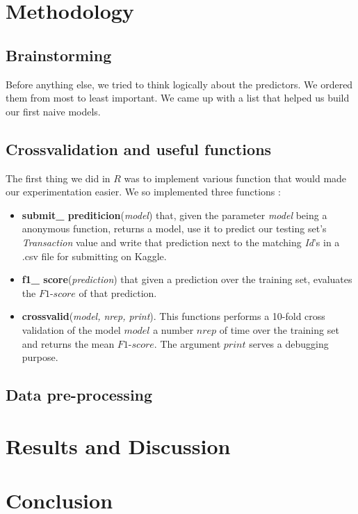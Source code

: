 \documentclass[11pt]{article}
\begin{document}
\newpage
\section*{Methodology}
\subsection*{Brainstorming}
Before anything else, we tried to think logically about the predictors. We ordered them from most to least important. We came up with a list that helped us build our first naive models.
\subsection*{Crossvalidation and useful functions}
The first thing we did in $R$ was to implement various function that would made our experimentation easier. We so implemented three functions :
\begin{itemize}
\item \textbf{submit\_ prediticion}(\emph{model}) that, given the parameter \emph{model} being a anonymous function, returns a model, use it to predict our testing set's \emph{Transaction} value and write that prediction next to the matching \emph{Id}'s in a .csv file for submitting on Kaggle.
\item \textbf{f1\_ score}(\emph{prediction}) that given a prediction over the training set, evaluates the $F1$-$score$ of that prediction.
\item \textbf{crossvalid}(\emph{model, nrep, print}). This functions performs a 10-fold cross validation of the model $model$ a number $nrep$ of time over the training set and returns the mean $F1$-$score$. The argument $print$ serves a debugging purpose.
\end{itemize}
\subsection*{Data pre-processing}


\newpage
\section*{Results and Discussion}
\newpage
\section*{Conclusion}
\end{document}
